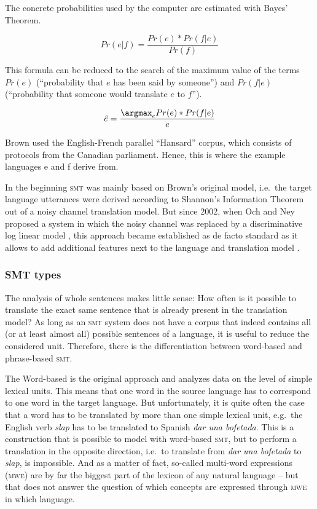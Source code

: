 \documentclass[output=paper]{LSP/langsci}
\begin{document}
The concrete probabilities used by the computer are estimated with Bayes' Theorem.

$$ Pr(e|f) = \frac{Pr(e) * Pr(f|e)}{Pr(f)} $$


This formula can be reduced to the search of the maximum value of the terms $Pr(e)$ (``probability that $e$ has been said by someone'') and $Pr(f|e)$ (``probability that someone would translate $e$ to $f$'').

$$\text{\textit{\^e}} = \frac{\argmax_e Pr(e) * Pr(f|e)}{e}$$

Brown used the English-French parallel ``Hansard'' corpus, which consists of protocols from the Canadian parliament. Hence, this is where the example languages e and f derive from.

In the beginning \textsc{smt} was mainly based on Brown's original model, i.e.\ the target language utterances were derived according to Shannon's Information Theorem out of a noisy channel translation model. But since 2002, when Och and Ney proposed a system in which the noisy channel was replaced by a discriminative log linear model \citep{Och2002}, this approach became established as de facto standard as it allows to add additional features next to the language and translation model \citep{Chiang2012}. 

\subsubsection{SMT types}\label{sec:stein:3.3}

The analysis of whole sentences makes little sense: How often is it possible to translate the exact same sentence that is already present in the translation model? As long as an \textsc{smt} system does not have a corpus that indeed contains all (or at least almost all) possible sentences of a language, it is useful to reduce the considered unit. Therefore, there is the differentiation between word-based and phrase-based \textsc{smt}.

\label{sec:stein:3.3.1}

The Word-based is the original approach and analyzes data on the level of simple lexical units. This means that one word in the source language has to correspond to one word in the target language. But unfortunately, it is quite often the case that a word has to be translated by more than one simple lexical unit, e.g.\ the English verb \textit{slap} has to be translated to Spanish \textit{dar una bofetada}. This is a construction that is possible to model with word-based \textsc{smt}, but to perform a translation in the opposite direction, i.e.\ to translate from \textit{dar una bofetada} to \textit{slap}, is impossible. And as a matter of fact, so-called multi-word expressions (\textsc{mwe}) are by far the biggest part of the lexicon of any natural language -- but that does not answer the question of which concepts are expressed through \textsc{mwe} in which language.
\end{document}
